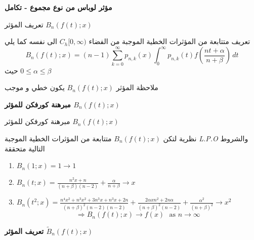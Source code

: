 	\begin{frame}
	\begin{center}
		\Huge\textbf{مؤثر لوباس من نوع مجموع - تكامل}
	\end{center}
\end{frame}
	
	\begin{frame}{تعريف المؤثر $B_n(f(t); x)$}
		\begin{exampleblock}{تعريف}
			متتابعة من المؤثرات الخطية الموجبة من الفضاء $C_h[0, \infty)$ الى نفسه كما يلي
			\[
			B_n(f(t); x) = (n-1)\sum_{k=0}^{\infty} p_{n, k}(x) \int_{0}^{\infty} p_{n, k}(t) f\left(\frac{nt + \alpha}{n + \beta}\right) \, dt
			\]
			حيث $0 \leq \alpha\leq \beta$
		\end{exampleblock}
		
		\pause
		\begin{exampleblock}{ملاحظة}
			المؤثر $B_n(f(t); x)$ يكون خطي و موجب
		\end{exampleblock}
	\end{frame}
	
	\begin{frame}
		\begin{center}
			\Huge\textbf{مبرهنة كورفكن للمؤثر $B_n(f(t); x)$}
		\end{center}
	\end{frame}
	
	\begin{frame}{مبرهنة كورفكن للمؤثر $B_n(f(t); x)$}
		\begin{exampleblock}{نظرية}
			لتكن $B_n(f(t);x)$ متتابعة من المؤثرات الخطية الموجبة \textit{L.P.O} والشروط التالية متحققة 
			\begin{english}
				\begin{enumerate}
					\item $B_n(1; x) =1 \to 1$
					\item $B_n(t; x) = \frac{n^2x + n}{(n+ \beta)(n-2)} + \frac{\alpha}{n + \beta} \to x$
					\item $B_n(t^2; x) = \frac{n^4x^2 + n^3x^2 + 3n^3x + n^3 x + 2n}{(n+\beta)^2 (n-2)(n-2)} + \frac{2\alpha x n^2 + 2n \alpha}{(n+\beta)^2 (n-2)} + \frac{\alpha^2 }{(n+\beta)^2} \to x^2$
					\[
					\Rightarrow B_n(f(t); x) \to f(x)\,\, \text{ as $n \to \infty$}
					\]
				\end{enumerate}
			\end{english}
		\end{exampleblock}
	\end{frame}
\newcommand{\tB}{\tilde{B}}	
\begin{frame}
	\begin{center}
		\Huge\textbf{تعريف المؤثر $\tB_n(f(t); x)$}
	\end{center}
\end{frame}

